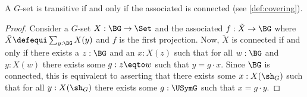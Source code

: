 \begin{lemma}
  \label{lem:conistrans}
  A $G$-set is transitive if and only if 
  the associated \covering is connected (see \cref{def:covering}).
\end{lemma}
\begin{proof}
  Consider a $G$-set $X:\BG\to\Set$ and the associated \covering
  $f:\tilde X\to\BG$ where $\tilde X\defequi\sum_{y:\BG}X(y)$ and $f$
  is the first projection.  Now, $\tilde X$ is connected if and only
  if there exists a $z:\BG$ and an $x:X(z)$ such that for
  all $w:\BG$ and $y:X(w)$ there exists some $g:z\eqto w$ such that $y=g\cdot x$.
  Since $\BG$ is connected, this is equivalent to asserting that there
  exists some $x:X(\sh_G)$ such that for all $y:X(\sh_G)$ there exists
  some $g:\USymG$ such that $x=g\cdot y$.
\end{proof}

